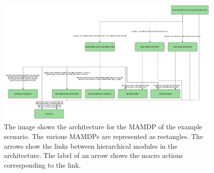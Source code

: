 \afterpage{\clearpage}
\begin{figure}
	\centering
	\includegraphics[scale=0.4]{img/coworker/mamdp/scenario_mamdp_architecture.pdf}
	\caption[MAMDP example: MAMDP model]{The image shows the architecture for the MAMDP of the example scenario. The various MAMDPs are represented as rectangles. The arrows show the links between hierarchical modules in the architecture. The label of an arrow shows the macro actions corresponding to the link.}
	\label{fig:mamdp-scenario_mamdp_architecture}
\end{figure}


